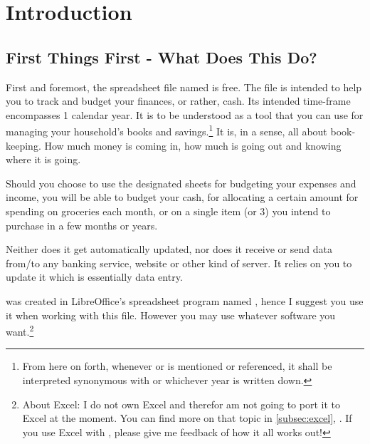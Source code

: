 \section{Introduction}
\label{sec:introduction}

\subsection{First Things First - What Does This Do?}
\label{subsec:first-things-first}

First and foremost, the spreadsheet file named  is free.
The file is intended to help you to track and budget your finances, or rather, cash.
Its intended time-frame encompasses 1 calendar year.
It is to be understood as a tool that you can use for managing your household's books and savings.\footnote{From here on forth, whenever  or \begriff{\tfn} is mentioned or referenced, it shall be interpreted synonymous with  or whichever year is written down.}
It is, in a sense, all about book-keeping.
How much money is coming in, how much is going out and knowing where it is going.


\begin{comment}
\begin{figure}[htp]
	\centering
	\caption[3r49twsef]{3r49twsef.
	d0f8934zsd.}
\end{figure}
\end{comment}

Should you choose to use the designated sheets for budgeting your expenses and income, you will be able to budget your cash, \eg for allocating a certain amount for spending on groceries each month, or on a single item (or 3) you intend to purchase in a few months or years.


Neither does it get automatically updated, nor does it receive or send data from/to any banking service, website or other kind of server.
It relies on you to update it which is essentially data entry.

\tfn was created in LibreOffice's spreadsheet program named , hence I suggest you use it when working with this file.
However you may use whatever software you want.\footnote{About Excel: I do not own Excel and therefor am not going to port it to Excel at the moment.
You can find more on that topic in \autoref{subsec:excel}, .
If you use Excel with \tfn, please give me feedback of how it all works out!}

